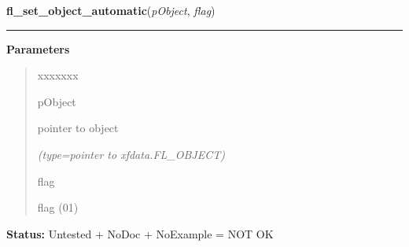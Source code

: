 \hspace{.8\funcindent}\begin{boxedminipage}{\funcwidth}

    \raggedright \textbf{fl\_set\_object\_automatic}(\textit{pObject}, \textit{flag})

    \vspace{-1.5ex}

    \rule{\textwidth}{0.5\fboxrule}
\setlength{\parskip}{2ex}
\setlength{\parskip}{1ex}
      \textbf{Parameters}
      \vspace{-1ex}

      \begin{quote}
        \begin{Ventry}{xxxxxxx}

          \item[pObject]

          pointer to object

            {\it (type=pointer to xfdata.FL\_OBJECT)}

          \item[flag]

          flag (0{\textbar}1)

        \end{Ventry}

      \end{quote}

\textbf{Status:} Untested + NoDoc + NoExample = NOT OK



    \end{boxedminipage}

    \label{xformslib:library:fl_object_is_automatic}

    \vspace{0.5ex}

